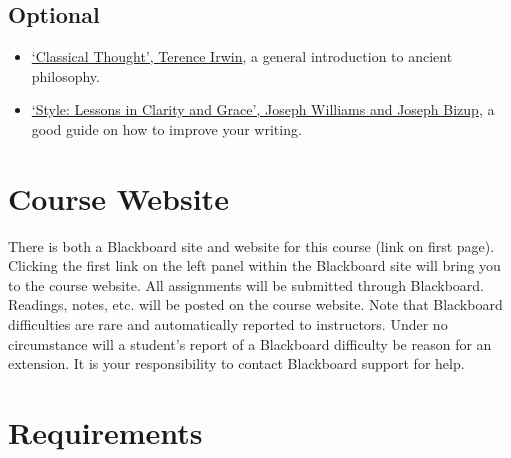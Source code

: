 \documentclass[article,oneside]{memoir}
\begin{document}
\subsection{Optional}

\begin{itemize}
\item \href{https://www.amazon.com/Classical-Thought-History-Western-Philosophy/dp/0192891774/ref=sr_1_1?s=books&ie=UTF8&qid=1515009994&sr=1-1&keywords=classical+thought}{`Classical Thought', Terence Irwin}, a general introduction to ancient philosophy.

\item \href{http://www.amazon.com/Style-Lessons-Clarity-Grace-11th/dp/0321898680/ref=sr_1_1?ie=UTF8&qid=1452356026&sr=8-1&keywords=lessons+in+clarity+and+grace}{`Style: Lessons in Clarity and Grace', Joseph Williams and Joseph Bizup}, a good guide on how to improve your writing. 
\end{itemize}
\section{Course Website}
There is both a Blackboard site and website for this course (link on first page). Clicking the first link on the left panel within the Blackboard site will bring you to the course website. All assignments will be submitted through Blackboard. Readings, notes, etc. will be posted on the course website. Note that Blackboard difficulties are rare and automatically reported to instructors. Under no circumstance will a student's report of a Blackboard difficulty be reason for an extension. It is your responsibility to contact Blackboard support for help.


\section{Requirements}
\end{document}
